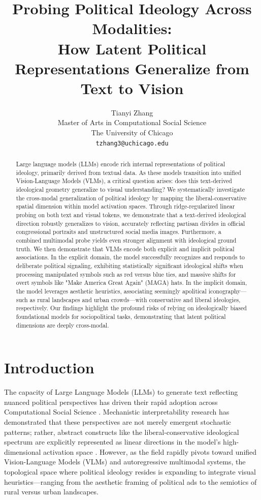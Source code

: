 \documentclass{article}
\title{Probing Political Ideology Across Modalities: \\How Latent Political Representations Generalize from Text to Vision}
\author{%
  Tianyi Zhang \\
  Master of Arts in Computational Social Science\\
  The University of Chicago\\
  \texttt{tzhang3@uchicago.edu} \\
}
\begin{document}
\maketitle


\begin{abstract}
  Large language models (LLMs) encode rich internal representations of political ideology, primarily derived from textual data. As these models transition into unified Vision-Language Models (VLMs), a critical question arises: does this text-derived ideological geometry generalize to visual understanding? We systematically investigate the cross-modal generalization of political ideology by mapping the liberal-conservative spatial dimension within model activation spaces. Through ridge-regularized linear probing on both text and visual tokens, we demonstrate that a text-derived ideological direction robustly generalizes to vision, accurately reflecting partisan divides in official congressional portraits and unstructured social media images. Furthermore, a combined multimodal probe yields even stronger alignment with ideological ground truth. We then demonstrate that VLMs encode both explicit and implicit political associations. In the explicit domain, the model successfully recognizes and responds to deliberate political signaling, exhibiting statistically significant ideological shifts when processing manipulated symbols such as red versus blue ties, and massive shifts for overt symbols like "Make America Great Again" (MAGA) hats. In the implicit domain, the model leverages aesthetic heuristics, associating seemingly apolitical iconography---such as rural landscapes and urban crowds---with conservative and liberal ideologies, respectively. Our findings highlight the profound risks of relying on ideologically biased foundational models for sociopolitical tasks, demonstrating that latent political dimensions are deeply cross-modal.
\end{abstract}


\section{Introduction}

The capacity of Large Language Models (LLMs) to generate text reflecting nuanced political perspectives has driven their rapid adoption across Computational Social Science \citep{argyleOutOneMany2023, bernardelleMappingInfluencingPolitical2024}. Mechanistic interpretability research has demonstrated that these perspectives are not merely emergent stochastic patterns; rather, abstract constructs like the liberal-conservative ideological spectrum are explicitly represented as linear directions in the model's high-dimensional activation space \citep{kimLinearRepresentationsPolitical2025, parkLinearRepresentationHypothesis2024}. However, as the field rapidly pivots toward unified Vision-Language Models (VLMs) and autoregressive multimodal systems, the topological space where political ideology resides is expanding to integrate visual heuristics---ranging from the aesthetic framing of political ads to the semiotics of rural versus urban landscapes.
\end{document}
